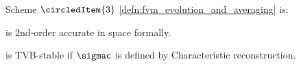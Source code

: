 \begin{corbox}\nospacing
    \begin{cor}
        Scheme $\circledItem{3}$ \cref{defn:fvm_evolution_and_averaging} is:
        \begin{itemizenosep}
            \item is 2nd-order accurate in space formally.
            \item is TVB-stable if $\sigmac$ is defined by Characteristic reconstruction.
        \end{itemizenosep}
    \end{cor}
\end{corbox}

